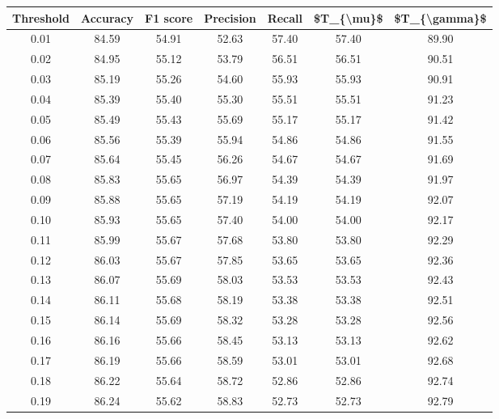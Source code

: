 \begin{tabular}{|c|c|c|c|c|c|c|}
\hline
 Threshold &  Accuracy &  F1 score &  Precision &  Recall &  \$T\_\{\textbackslash mu\}\$ &  \$T\_\{\textbackslash gamma\}\$ \\
\hline
      0.01 &     84.59 &     54.91 &      52.63 &   57.40 &      57.40 &         89.90 \\
      0.02 &     84.95 &     55.12 &      53.79 &   56.51 &      56.51 &         90.51 \\
      0.03 &     85.19 &     55.26 &      54.60 &   55.93 &      55.93 &         90.91 \\
      0.04 &     85.39 &     55.40 &      55.30 &   55.51 &      55.51 &         91.23 \\
      0.05 &     85.49 &     55.43 &      55.69 &   55.17 &      55.17 &         91.42 \\
      0.06 &     85.56 &     55.39 &      55.94 &   54.86 &      54.86 &         91.55 \\
      0.07 &     85.64 &     55.45 &      56.26 &   54.67 &      54.67 &         91.69 \\
      0.08 &     85.83 &     55.65 &      56.97 &   54.39 &      54.39 &         91.97 \\
      0.09 &     85.88 &     55.65 &      57.19 &   54.19 &      54.19 &         92.07 \\
      0.10 &     85.93 &     55.65 &      57.40 &   54.00 &      54.00 &         92.17 \\
      0.11 &     85.99 &     55.67 &      57.68 &   53.80 &      53.80 &         92.29 \\
      0.12 &     86.03 &     55.67 &      57.85 &   53.65 &      53.65 &         92.36 \\
      0.13 &     86.07 &     55.69 &      58.03 &   53.53 &      53.53 &         92.43 \\
      0.14 &     86.11 &     55.68 &      58.19 &   53.38 &      53.38 &         92.51 \\
      0.15 &     86.14 &     55.69 &      58.32 &   53.28 &      53.28 &         92.56 \\
      0.16 &     86.16 &     55.66 &      58.45 &   53.13 &      53.13 &         92.62 \\
      0.17 &     86.19 &     55.66 &      58.59 &   53.01 &      53.01 &         92.68 \\
      0.18 &     86.22 &     55.64 &      58.72 &   52.86 &      52.86 &         92.74 \\
      0.19 &     86.24 &     55.62 &      58.83 &   52.73 &      52.73 &         92.79 \\

\end{tabular}
